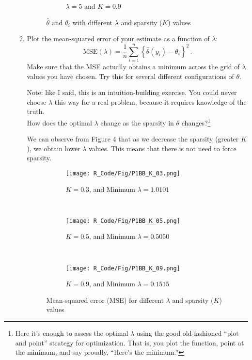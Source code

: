 \documentclass[11 pt]{article}
\begin{document}
\begin{enumerate}[label=(\Alph*)]
\begin{enumerate}[label=\arabic*.]
\begin{figure}[H]
\begin{center}
\begin{subfigure}[h]{0.3\linewidth}
			\caption{$\lambda=5$ and $K=0.9$}
		\end{subfigure}
			\caption{ $\widehat{\theta}$  and $\theta_i$ with different  $\lambda$ and sparsity ($K$) values}
			\label{fig:Fig1}
		\end{center}
	\end{figure}
	\newpage
	\item Plot the mean-squared error of your estimate as a function of $\lambda$:
	$$
	\mbox{MSE}(\lambda) = \frac{1}{n} \sum_{i=1}^n  \left\{ \widehat{\theta}(y_i) - \theta_i \right\}^2 \, .
	$$
	Make sure that the MSE actually obtains a minimum across the grid of $\lambda$ values you have chosen.
	Try this for several different configurations of $\theta$.  

Note: like I said, this is an intuition-building exercise.  You could never choose $\lambda$ this way for a real problem, because it requires knowledge of the truth.\\


\newpage
How does the optimal $\lambda$ change as the sparsity in $\theta$ changes?\footnote{Here it's enough to assess the optimal $\lambda$ using the good old-fashioned ``plot and point'' strategy for optimization.  That is, you plot the function, point at the minimum, and say proudly, ``Here's the minimum.''}

We can observe from Figure 4 that as we decrease the sparsity (greater $K$), we obtain lower $\lambda$ values. This means that there is not need to force sparsity.\\


		\begin{figure}[H]
		\begin{center}
			\begin{subfigure}[h]{0.4\linewidth}
				\texttt{[image: R\_Code/Fig/P1BB\_K\_03.png]}
				\caption{$K=0.3$, and Minimum $\lambda = 1.0101$}
			\end{subfigure}\\
			\begin{subfigure}[h]{0.4\linewidth}
				\texttt{[image: R\_Code/Fig/P1BB\_K\_05.png]}
				\caption{$K=0.5$, and Minimum $\lambda = 0.5050$}
			\end{subfigure}\\
			\begin{subfigure}[h]{0.4\linewidth}
				\texttt{[image: R\_Code/Fig/P1BB\_K\_09.png]}
				\caption{$K=0.9$, and Minimum $\lambda = 0.1515$}
			\end{subfigure}
		\caption{ Mean-squared error (MSE)  for different $\lambda$ and sparsity ($K$) values}
		\label{fig:Fig1}
		\end{center}
		\end{figure}

\end{enumerate}
\end{enumerate}
\end{document}
